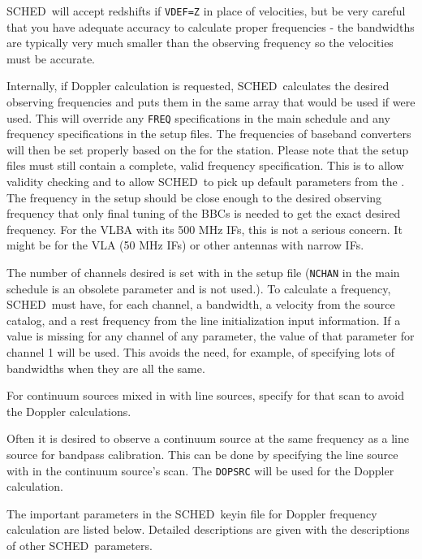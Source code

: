 \documentclass{report}
\newcommand{\schedb}{{\sc SCHED~}}
\begin{document}
\schedb will accept redshifts if {\tt VDEF=Z} in place of
velocities, but be very careful that you have adequate accuracy
to calculate proper frequencies - the bandwidths are typically
very much smaller than the observing frequency so the velocities
must be accurate.

Internally, if Doppler calculation is requested, \schedb calculates
the desired observing frequencies and puts them in the same array that
would be used if  were used. This will
override any {\tt FREQ} specifications in the main schedule and any
frequency specifications in the setup files.  The frequencies of
baseband converters will then be set properly based on the
 for the station.  Please note that
the setup files must still contain a complete, valid frequency
specification.  This is to allow validity checking and to allow
\schedb to pick up default parameters from the
.  The frequency in the setup
should be close enough to the desired observing frequency that only
final tuning of the BBCs is needed to get the exact desired frequency.
For the VLBA with its 500 MHz IFs, this is not a serious concern.  It
might be for the VLA (50 MHz IFs) or other antennas with narrow IFs.

The number of channels desired is set with  in the setup file ({\tt NCHAN} in the main schedule
is an obsolete parameter and is not used.).  To calculate a frequency,
\schedb must have, for each channel, a bandwidth, a velocity from
the source catalog, and a rest frequency from the line initialization
input information.  If a value is missing for any channel of any
parameter, the value of that parameter for channel 1 will be
used. This avoids the need, for example, of specifying lots of
bandwidths when they are all the same.

For continuum sources mixed in with line sources, specify  for that scan to avoid the Doppler calculations.

Often it is desired to observe a continuum source at the same
frequency as a line source for bandpass calibration. This can be done
by specifying the line source with 
in the continuum source's scan. The {\tt DOPSRC} will be used for the
Doppler calculation.

The important parameters in the \schedb keyin file for Doppler
frequency calculation are listed below. Detailed descriptions are
given with the descriptions of other \schedb parameters.
\end{document}
